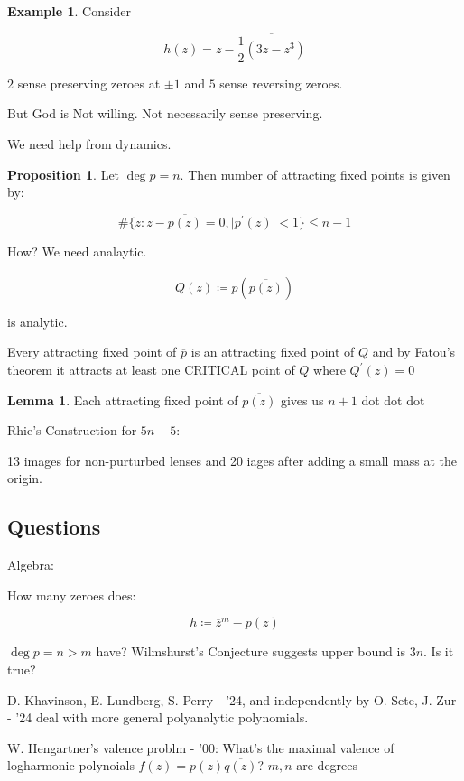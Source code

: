 \documentclass{article}
\theoremstyle{definition}
\newtheorem*{example}{Example}
\newtheorem{proposition}[theorem]{Proposition}
\newtheorem{lemma}[theorem]{Lemma}
\begin{document}
\begin{example}
    Consider

    \[
        h(z) = z - \overline{\frac{1}{2}(3z - z^3)} 
    \]

    \(2\) sense preserving zeroes at \(\pm 1\) and \(5\) sense reversing zeroes.
\end{example}

But God is Not willing. Not necessarily sense preserving.

We need help from dynamics.

\begin{proposition}
    Let \(\deg p = n\). Then number of attracting fixed points is given by:
    
    \[
        \#\{ z : z - \overline{p(z)} = 0, \vert p^{\prime} (z) \vert < 1 \} \leq n-1
    \]

    How? We need analaytic.

    \[
        Q(z) \coloneqq \overline{p(\overline{p(z)} )}
    \]

    is analytic.

    Every attracting fixed point of \(\overline{p} \) is an attracting fixed point of \(Q\) and by Fatou's theorem it attracts at least one CRITICAL point of \(Q\) where \(Q^{\prime} (z) = 0\) 
\end{proposition}

\begin{lemma}
    Each attracting fixed point of \(\overline{p(z)} \) gives us \(n+1\) dot dot dot
\end{lemma}

Rhie's Construction for $5n-5$:

13 images for non-purturbed lenses and 20 iages after adding a small mass at the origin.

\subsection*{Questions}

Algebra:

How many zeroes does:

\[
    h \coloneqq \overline{z}^m - p(z)
\]

\(\deg p = n > m\) have? Wilmshurst's Conjecture suggests upper bound is \(3n\). Is it true?

D. Khavinson, E. Lundberg, S. Perry - '24, and independently by O. Sete, J. Zur - '24 deal with more general polyanalytic polynomials.

W. Hengartner's valence problm - '00: What's the maximal valence of logharmonic polynoials \(f(z) = p(z) \overline{q(z)}\)? \(m,n\) are degrees
\end{document}
